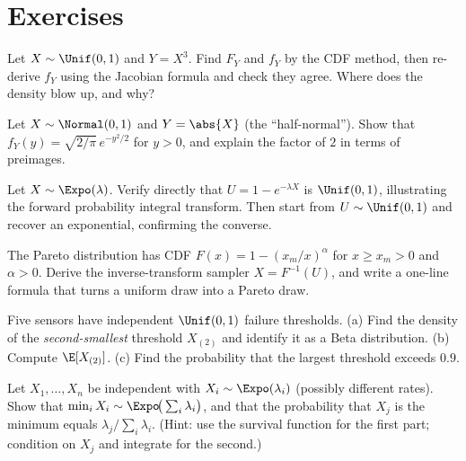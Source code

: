 \section*{Exercises}

\begin{exercise}
\label{ch16:ex-cube}
Let $X \sim \Unif(0,1)$ and $Y = X^3$. Find $F_Y$ and $f_Y$ by the CDF method, then
re-derive $f_Y$ using the Jacobian formula and check they agree. Where does the density
blow up, and why?
\end{exercise}

\begin{exercise}
\label{ch16:ex-abs}
Let $X \sim \Normal(0,1)$ and $Y = \abs{X}$ (the ``half-normal''). Show that
$f_Y(y) = \sqrt{2/\pi}\,e^{-y^2/2}$ for $y>0$, and explain the factor of $2$ in terms of
preimages.
\end{exercise}

\begin{exercise}
\label{ch16:ex-expo-pit}
Let $X \sim \Expo(\lambda)$. Verify directly that $U = 1 - e^{-\lambda X}$ is $\Unif(0,1)$,
illustrating the forward probability integral transform. Then start from
$U \sim \Unif(0,1)$ and recover an exponential, confirming the converse.
\end{exercise}

\begin{exercise}
\label{ch16:ex-pareto}
The Pareto distribution has CDF $F(x) = 1 - (x_m/x)^{\alpha}$ for $x \ge x_m > 0$ and
$\alpha>0$. Derive the inverse-transform sampler $X = F^{-1}(U)$, and write a one-line
formula that turns a uniform draw into a Pareto draw.
\end{exercise}

\begin{exercise}
\label{ch16:ex-order}
Five sensors have independent $\Unif(0,1)$ failure thresholds. (a) Find the density of the
\emph{second-smallest} threshold $X_{(2)}$ and identify it as a Beta distribution. (b)
Compute $\E[X_{(2)}]$. (c) Find the probability that the largest threshold exceeds $0.9$.
\end{exercise}

\begin{exercise}
\label{ch16:ex-min-expo}
Let $X_1,\dots,X_n$ be independent with $X_i \sim \Expo(\lambda_i)$ (possibly different
rates). Show that $\min_i X_i \sim \Expo\!\big(\sum_i \lambda_i\big)$, and that the
probability that $X_j$ is the minimum equals $\lambda_j / \sum_i \lambda_i$. (Hint: use the
survival function for the first part; condition on $X_j$ and integrate for the second.)
\end{exercise}

